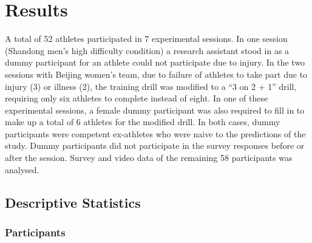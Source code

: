 \documentclass[english]{article}\usepackage[]{graphicx}\usepackage[]{color}
\begin{document}


















\section{Results}
A total of 52 athletes participated in 7 experimental sessions. In one session (Shandong men's high difficulty condition) a research assistant stood in as a dummy participant for an athlete could not participate due to injury.  In the two sessions with Beijing women's team, due to failure of athletes to take part due to injury (3) or illness (2), the training drill was modified to a ``3 on 2 + 1'' drill, requiring only six athletes to complete instead of eight. In one of these experimental sessions, a female dummy participant was also required to fill in to make up a total of 6 athletes for the modified drill.  In both cases, dummy participants were competent ex-athletes who were naive to the predictions of the study.  Dummy participants did not participate in the survey responses before or after the session. Survey and video data of the remaining 58 participants was analysed.






\subsection{Descriptive Statistics}

\subsubsection{Participants}
\end{document}
